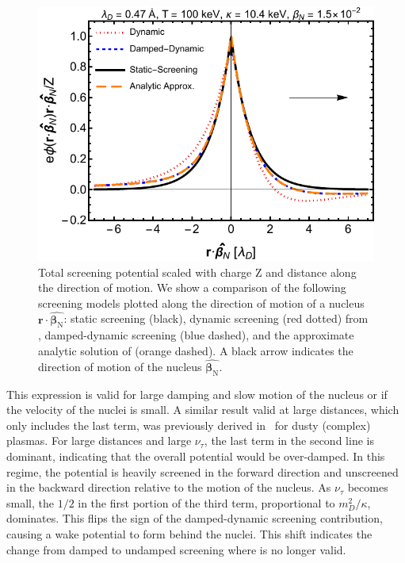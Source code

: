 \begin{figure} 
 \centerline{
\includegraphics[width=.80\linewidth]{plots/phidat_100_1_1_0_full_lin.pdf}}
 \caption{Total screening potential scaled with charge Z and distance along the direction of motion. We show a comparison of the following screening models plotted along the direction of motion of a nucleus $\boldsymbol{r}\cdot\hat{\boldsymbol{\beta}_{\text{N}}}$: static screening (black), dynamic screening (red dotted) from \cite{Hwang:2021kno}, damped-dynamic screening (blue dashed), and the approximate analytic solution of  (orange dashed). A black arrow indicates the direction of motion of the nucleus $\hat{\boldsymbol{\beta}_{\text{N}}}$. }
 \label{fig:dynamiclinear}
\end{figure} 

This expression  is valid for large damping and slow motion of the nucleus or if the velocity of the nuclei is small. A similar result valid at large distances, which only includes the last term, was previously derived in~\cite{Stenflo:1973} for dusty (complex) plasmas. For large distances and large $\nu_\tau$, the last term in the second line is dominant, indicating that the overall potential would be over-damped. In this regime, the potential is heavily screened in the forward direction and unscreened in the backward direction relative to the motion of the nucleus. As $\nu_\tau$ becomes small, the $1/2$ in the first portion of the third term, proportional to $m_D^2/\kappa$, dominates. This flips the sign of the damped-dynamic screening contribution, causing a wake potential to form behind the nuclei. This shift indicates the change from damped to undamped screening where  is no longer valid. 

